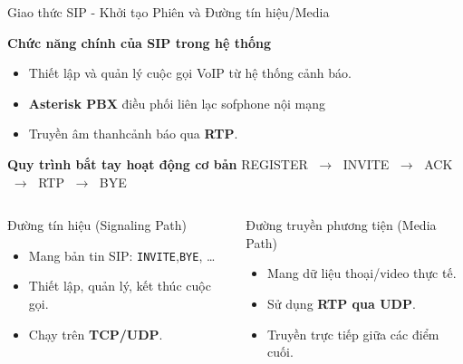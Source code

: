 

\begin{frame}{Giao thức SIP - Khởi tạo Phiên và Đường tín hiệu/Media}

\begin{block}{\textbf{Chức năng chính của SIP trong hệ thống}}
\begin{itemize}
    \item Thiết lập và quản lý cuộc gọi VoIP từ hệ thống cảnh báo.
    \item \textbf{Asterisk PBX} điều phối liên lạc sofphone nội mạng 
    \item Truyền âm thanhcảnh báo qua \textbf{RTP}.
\end{itemize}
\end{block}

\begin{block}{\textbf{Quy trình bắt tay hoạt động cơ bản}}
    \textcolor{blue!70!black}{REGISTER} $\;\rightarrow\;$ 
    \textcolor{green!60!black}{INVITE} $\;\rightarrow\;$ 
    \textcolor{orange!80!black}{ACK} $\;\rightarrow\;$ 
    \textcolor{purple!70!black}{RTP} $\;\rightarrow\;$ 
    \textcolor{red!70!black}{BYE}
\end{block}

\begin{columns}[T,onlytextwidth]
    \begin{block}{\textcolor{blue!70!black}{Đường tín hiệu (Signaling Path)}}
        \begin{itemize}
            \item Mang bản tin SIP: \texttt{INVITE},\texttt{BYE}, \dots
            \item Thiết lập, quản lý, kết thúc cuộc gọi.
            \item Chạy trên \textbf{TCP/UDP}.
        \end{itemize}
    \end{block}

    \begin{block}{\textcolor{purple!70!black}{Đường truyền phương tiện (Media Path)}}
        \begin{itemize}
            \item Mang dữ liệu thoại/video thực tế.
            \item Sử dụng \textbf{RTP qua UDP}.
            \item Truyền trực tiếp giữa các điểm cuối.
        \end{itemize}
    \end{block}
\end{columns}
\end{frame}


